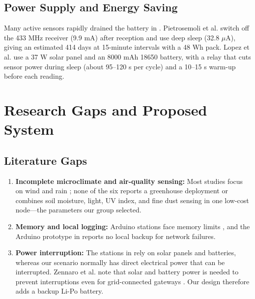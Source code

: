 \documentclass[conference]{IEEEtran}
\begin{document}
\subsection{Power Supply and Energy Saving}
Many active sensors rapidly drained the battery in \cite{dajnowski2024}. Pietrosemoli et al. \cite{pietrosemoli2019} switch off the 433 MHz receiver (9.9 mA) after reception and use deep sleep (32.8 $\mu$A), giving an estimated 414 days at 15-minute intervals with a 48 Wh pack. Lopez et al. \cite{lopez2025} use a 37 W solar panel and an 8000 mAh 18650 battery, with a relay that cuts sensor power during sleep (about 95--120 s per cycle) and a 10--15 s warm-up before each reading.

\section{Research Gaps and Proposed System}

\subsection{Literature Gaps}
\begin{enumerate}
    \item \textbf{Incomplete microclimate and air-quality sensing:} Most studies focus on wind and rain \cite{dajnowski2024, zennaro2025, pietrosemoli2019, murdyantoro2019}; none of the six reports a greenhouse deployment or combines soil moisture, light, UV index, and fine dust sensing in one low-cost node---the parameters our group selected.
    \item \textbf{Memory and local logging:} Arduino stations face memory limits \cite{dajnowski2024}, and the Arduino prototype in \cite{murdyantoro2019} reports no local backup for network failures.
    \item \textbf{Power interruption:} The stations in \cite{zennaro2025, lopez2025} rely on solar panels and batteries, whereas our scenario normally has direct electrical power that can be interrupted. Zennaro et al. note that solar and battery power is needed to prevent interruptions even for grid-connected gateways \cite{zennaro2025}. Our design therefore adds a backup Li-Po battery.
\end{enumerate}
\end{document}
